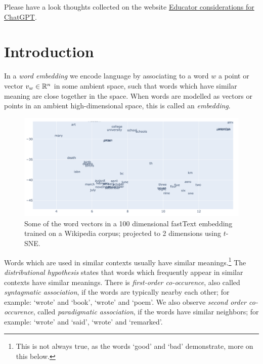 \documentclass[11pt, a4paper]{amsart}
\begin{document}
Please have a look thoughts collected on the website \href{https://platform.openai.com/docs/chatgpt-education}{Educator considerations for ChatGPT}.

\clearpage
\section{Introduction}
\label{sec:intro}

In a \emph{word embedding} we encode language by associating to a word $w$ a point or vector $v_{w} \in \mathbb{R}^{n}$ in some ambient space, such that words which have similar meaning are close together in the space.
When words are modelled as vectors or points in an ambient high-dimensional space, this is called an \emph{embedding}.

\begin{figure}[H]
    \centering
    \includegraphics[width=\linewidth]{figures/fastText_tSNE_screenshot.png}
    \caption{
    	Some of the word vectors in a 100 dimensional fastText embedding trained on a Wikipedia corpus; projected to 2 dimensions using $t$-SNE.
    }
    \label{fig:fastText_tSNE}
\end{figure}

Words which are used in similar contexts usually have similar meanings.\footnote{This is not always true, as the words `good' and `bad' demonstrate, more on this below.}
The \emph{distributional hypothesis} states that words which frequently appear in similar contexts have similar meanings.
There is \emph{first-order co-occurence}, also called \emph{syntagmatic association}, if the words are typically nearby each other; for example: `wrote' and `book', `wrote' and `poem'.
We also observe \emph{second order co-occurence}, called \emph{paradigmatic association}, if the words have similar neighbors; for example: `wrote' and `said', `wrote' and `remarked'.
\end{document}
